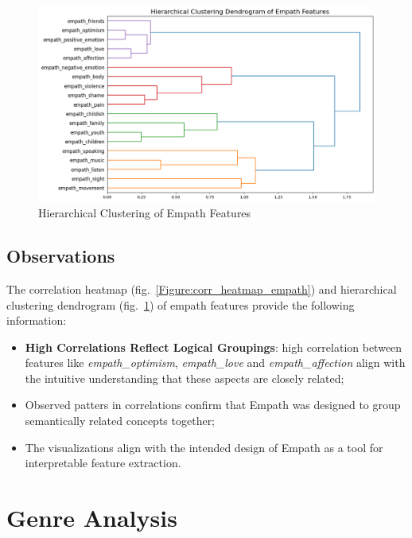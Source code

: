 \begin{center}
\begin{figure}[H]
  \centering
  \includegraphics[width=6in]{img/dendrogram_empath.png}
  \caption{Hierarchical Clustering of Empath Features}
  \label{Figure:dendrogram_empath}
\end{figure}
\end{center}


\subsection*{Observations}
The correlation heatmap (fig.~\ref{Figure:corr_heatmap_empath}) and 
hierarchical clustering dendrogram (fig.~\ref{Figure:dendrogram_empath}) of
empath features provide the following information:
\begin{itemize}
  \item \textbf{High Correlations Reflect Logical Groupings}: high correlation
    between features like \textit{empath\_optimism}, \textit{empath\_love} and
    \textit{empath\_affection} align with the intuitive understanding that
    these aspects are closely related;
  \item Observed patters in correlations confirm that Empath was designed to
    group semantically related concepts together;
  \item The visualizations align with the intended design of Empath as a tool
    for interpretable feature extraction.
\end{itemize}



\section{Genre Analysis}

